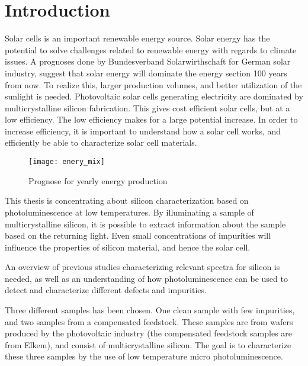 
\section{Introduction}

Solar cells is an important renewable energy source. Solar energy has the potential to solve challenges related to renewable energy with regards to climate issues. A prognoses done by Bundesverband Solarwirthschaft for German solar industry, suggest that solar energy will dominate the energy section 100 years from now. To realize this, larger production volumes, and better utilization of the sunlight is needed. Photovoltaic solar cells generating electricity are dominated by multicrystalline silicon fabrication. This gives cost efficient solar cells, but at a low efficiency. The low efficiency makes for a large potential increase. In order to increase efficiency, it is important to understand how a solar cell works, and efficiently be able to characterize solar cell materials.

\begin{figure}[H]
\texttt{[image: enery\_mix]}%
\caption{Prognose for yearly energy production}%
\label{fig:energimix}%
\end{figure}

This thesis is concentrating about silicon characterization based on photoluminescence at low temperatures. By illuminating a sample of multicrystalline silicon, it is possible to extract information about the sample based on the returning light. Even small concentrations of impurities will influence the properties of silicon material, and hence the solar cell. 

An overview of previous studies characterizing relevant spectra for silicon is needed, as well as an understanding of how photoluminescence can be used to detect and characterize different defects and impurities. 

Three different samples has been chosen. One clean sample with few impurities, and two samples from a compensated feedstock. These samples are from wafers produced by the photovoltaic industry (the compensated feedstock samples are from Elkem), and consist of multicrystalline silicon. The goal is to characterize these three samples by the use of low temperature micro photoluminescence.